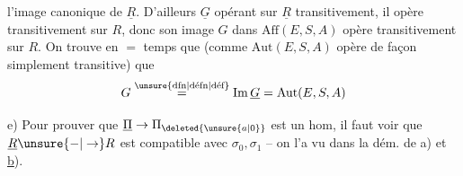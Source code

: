 l'image canonique de $\underline R$. D'ailleurs
$\underline G$ opérant sur $\underline R$ transitivement,
il opère transitivement sur $R$, donc
son image $G$ dans $\mathrm{Aff}(E,S,A)$ opère transitivement
sur $R$. On trouve en $=$
temps que (comme $\mathrm{Aut}(E,S,A)$ opère de
façon simplement transitive) que
\[
G\overset{\text{\unsure{dfn|défn|déf}}}{=}\mathrm{Im}\,\underline G=\mathrm{Aut}(E,S,A)
\]

e) Pour prouver que $\underline\Pi\to\Pi_{\deleted{\unsure{a|0}}}$ est
un hom, il faut voir que $\underline R\unsure{-|\to}R$
est compatible avec $\sigma_0,\sigma_1$ -- on l'a
vu dans la dém. de a) et \uline{b}).
